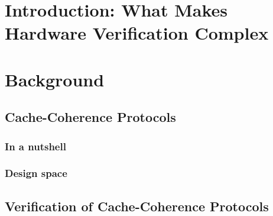 \chapter{Introduction: What Makes Hardware Verification Complex}

\chapter{Background}

\section{Cache-Coherence Protocols}

\subsection{In a nutshell}
\label{sec-nutshell}

\subsection{Design space}

\section{Verification of Cache-Coherence Protocols}
